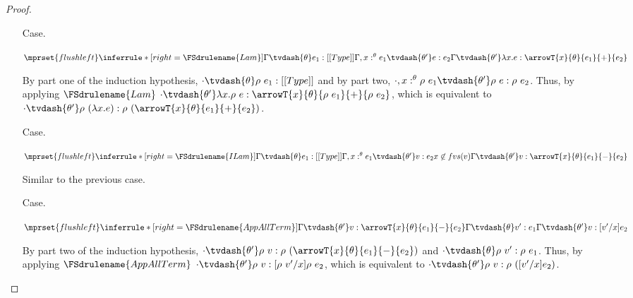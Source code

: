 \begin{proof}
\begin{itemize}
  \item[Case.]\ \\
    \begin{center}
      \begin{math}
        $$\mprset{flushleft}
        \inferrule* [right=\FSdrulename{Lam}] {
          \Gamma \tvdash{\theta} e_1:[[Type]]
          \\\\
          \Gamma,x:^{\theta} e_1 \tvdash{\theta'} e:e_2
        }{\Gamma \tvdash{\theta'} 
          \lambda x.e:\arrowT{x}{\theta}{e_1}{+}{e_2}}
      \end{math}
    \end{center}
    By part one of the induction hypothesis, $\cdot \tvdash{\theta} \rho\ e_1:[[Type]]$ and
    by part two, $\cdot,x:^{\theta} \rho\ e_1 \tvdash{\theta'} \rho\ e:\rho\ e_2$.  Thus, by
    applying $\FSdrulename{Lam}$ 
    $\cdot \tvdash{\theta'} \lambda x.\rho\ e:\arrowT{x}{\theta}{\rho\ e_1}{+}{\rho\ e_2}$, which
    is equivalent to 
    $\cdot \tvdash{\theta'} \rho\ (\lambda x.e):\rho\ (\arrowT{x}{\theta}{e_1}{+}{e_2})$.

  \item[Case.]\ \\
    \begin{center}
      \begin{math}
        $$\mprset{flushleft}
        \inferrule* [right=\FSdrulename{ILam}] {
          \Gamma \tvdash{\theta} e_1:[[Type]]
          \\\\
          \Gamma,x:^{\theta} e_1 \tvdash{\theta'} v:e_2
          \\\\
          x \not \in fvs(v)
        }{\Gamma \tvdash{\theta'} 
          v:\arrowT{x}{\theta}{e_1}{-}{e_2}}
      \end{math}
    \end{center}
    Similar to the previous case.

  \item[Case.]\ \\
    \begin{center}
      \begin{math}
        $$\mprset{flushleft}
        \inferrule*[right=\FSdrulename{AppAllTerm}]{
          \Gamma \tvdash{\theta'} v:\arrowT{x}{\theta}{e_1}{-}{e_2}
          \\\\
          \Gamma \tvdash{\theta} v':e_1
        }{\Gamma \tvdash{\theta'} v:[v'/x]e_2}
      \end{math}
    \end{center}
    By part two of the induction hypothesis, 
    $\cdot \tvdash{\theta'} \rho\ v:\rho\ (\arrowT{x}{\theta}{e_1}{-}{e_2})$ and
    $\cdot \tvdash{\theta} \rho\ v':\rho\ e_1$.  Thus, by applying $\FSdrulename{AppAllTerm}$
    $\cdot \tvdash{\theta'} \rho\ v:[\rho\ v'/x]\rho\ e_2$, which is equivalent to
    $\cdot \tvdash{\theta'} \rho\ v:\rho\ ([v'/x]e_2)$.


\end{itemize}
\end{proof}
